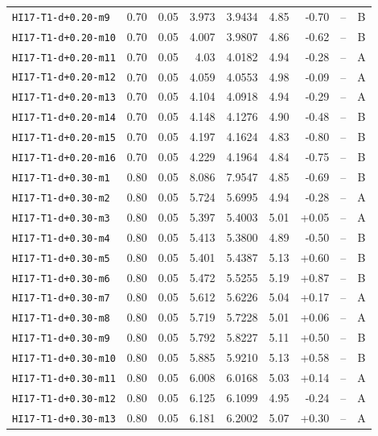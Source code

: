 \begin{longtable}{@{}lrrrrrrrc@{}}
\texttt{HI17-T1-d+0.20-m9} & 0.70 & 0.05 & 3.973 & 3.9434 & 4.85 & -0.70 & -- & B\\
\texttt{HI17-T1-d+0.20-m10} & 0.70 & 0.05 & 4.007 & 3.9807 & 4.86 & -0.62 & -- & B\\
\texttt{HI17-T1-d+0.20-m11} & 0.70 & 0.05 & 4.03 & 4.0182 & 4.94 & -0.28 & -- & A\\
\texttt{HI17-T1-d+0.20-m12} & 0.70 & 0.05 & 4.059 & 4.0553 & 4.98 & -0.09 & -- & A\\
\texttt{HI17-T1-d+0.20-m13} & 0.70 & 0.05 & 4.104 & 4.0918 & 4.94 & -0.29 & -- & A\\
\texttt{HI17-T1-d+0.20-m14} & 0.70 & 0.05 & 4.148 & 4.1276 & 4.90 & -0.48 & -- & B\\
\texttt{HI17-T1-d+0.20-m15} & 0.70 & 0.05 & 4.197 & 4.1624 & 4.83 & -0.80 & -- & B\\
\texttt{HI17-T1-d+0.20-m16} & 0.70 & 0.05 & 4.229 & 4.1964 & 4.84 & -0.75 & -- & B\\
\texttt{HI17-T1-d+0.30-m1} & 0.80 & 0.05 & 8.086 & 7.9547 & 4.85 & -0.69 & -- & B\\
\texttt{HI17-T1-d+0.30-m2} & 0.80 & 0.05 & 5.724 & 5.6995 & 4.94 & -0.28 & -- & A\\
\texttt{HI17-T1-d+0.30-m3} & 0.80 & 0.05 & 5.397 & 5.4003 & 5.01 & +0.05 & -- & A\\
\texttt{HI17-T1-d+0.30-m4} & 0.80 & 0.05 & 5.413 & 5.3800 & 4.89 & -0.50 & -- & B\\
\texttt{HI17-T1-d+0.30-m5} & 0.80 & 0.05 & 5.401 & 5.4387 & 5.13 & +0.60 & -- & B\\
\texttt{HI17-T1-d+0.30-m6} & 0.80 & 0.05 & 5.472 & 5.5255 & 5.19 & +0.87 & -- & B\\
\texttt{HI17-T1-d+0.30-m7} & 0.80 & 0.05 & 5.612 & 5.6226 & 5.04 & +0.17 & -- & A\\
\texttt{HI17-T1-d+0.30-m8} & 0.80 & 0.05 & 5.719 & 5.7228 & 5.01 & +0.06 & -- & A\\
\texttt{HI17-T1-d+0.30-m9} & 0.80 & 0.05 & 5.792 & 5.8227 & 5.11 & +0.50 & -- & B\\
\texttt{HI17-T1-d+0.30-m10} & 0.80 & 0.05 & 5.885 & 5.9210 & 5.13 & +0.58 & -- & B\\
\texttt{HI17-T1-d+0.30-m11} & 0.80 & 0.05 & 6.008 & 6.0168 & 5.03 & +0.14 & -- & A\\
\texttt{HI17-T1-d+0.30-m12} & 0.80 & 0.05 & 6.125 & 6.1099 & 4.95 & -0.24 & -- & A\\
\texttt{HI17-T1-d+0.30-m13} & 0.80 & 0.05 & 6.181 & 6.2002 & 5.07 & +0.30 & -- & A\\

\end{longtable}
